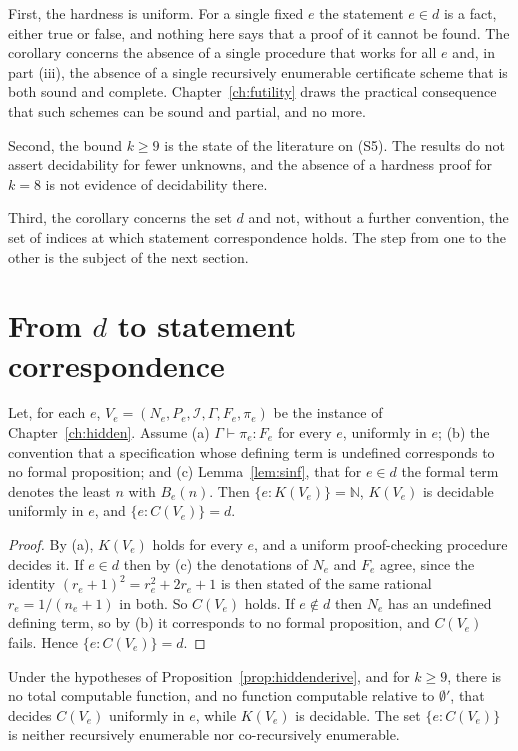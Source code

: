 First, the hardness is uniform. For a single fixed $e$ the statement $e\in d$ is a fact, either true or false, and nothing here says that a proof of it cannot be found. The corollary concerns the absence of a single procedure that works for all $e$ and, in part (iii), the absence of a single recursively enumerable certificate scheme that is both sound and complete. Chapter~\ref{ch:futility} draws the practical consequence that such schemes can be sound and partial, and no more.

Second, the bound $k\ge9$ is the state of the literature on (S5). The results do not assert decidability for fewer unknowns, and the absence of a hardness proof for $k=8$ is not evidence of decidability there.

Third, the corollary concerns the set $d$ and not, without a further convention, the set of indices at which statement correspondence holds. The step from one to the other is the subject of the next section.

\section{From $d$ to statement correspondence}

\begin{proposition}
\label{prop:hiddenderive}
Let, for each $e$, $V_e=(N_e,P_e,\mathcal{I},\Gamma,F_e,\pi_e)$ be the instance of Chapter~\ref{ch:hidden}. Assume (a) $\Gamma\vdash\pi_e:F_e$ for every $e$, uniformly in $e$; (b) the convention that a specification whose defining term is undefined corresponds to no formal proposition; and (c) Lemma~\ref{lem:sinf}, that for $e\in d$ the formal term denotes the least $n$ with $B_e(n)$. Then $\{e:K(V_e)\}=\mathbb{N}$, $K(V_e)$ is decidable uniformly in $e$, and $\{e:C(V_e)\}=d$.
\end{proposition}

\begin{proof}
By (a), $K(V_e)$ holds for every $e$, and a uniform proof-checking procedure decides it. If $e\in d$ then by (c) the denotations of $N_e$ and $F_e$ agree, since the identity $(r_e+1)^2=r_e^2+2r_e+1$ is then stated of the same rational $r_e=1/(n_e+1)$ in both. So $C(V_e)$ holds. If $e\notin d$ then $N_e$ has an undefined defining term, so by (b) it corresponds to no formal proposition, and $C(V_e)$ fails. Hence $\{e:C(V_e)\}=d$.
\end{proof}

\begin{corollary}
\label{cor:gap}
Under the hypotheses of Proposition~\ref{prop:hiddenderive}, and for $k\ge9$, there is no total computable function, and no function computable relative to $\emptyset'$, that decides $C(V_e)$ uniformly in $e$, while $K(V_e)$ is decidable. The set $\{e:C(V_e)\}$ is neither recursively enumerable nor co-recursively enumerable.
\end{corollary}

